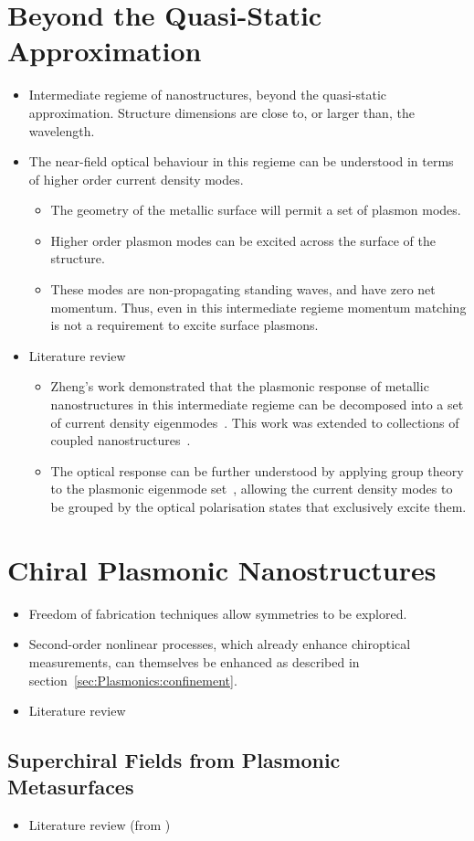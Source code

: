 \section{Beyond the Quasi-Static Approximation}
\begin{itemize}
    \item Intermediate regieme of nanostructures, beyond the quasi-static approximation. Structure dimensions are close to, or larger than, the wavelength.
    \item The near-field optical behaviour in this regieme can be understood in terms of higher order current density modes.
    \begin{itemize}
        \item The geometry of the metallic surface will permit a set of plasmon modes.
        \item Higher order plasmon modes can be excited across the surface of the structure.
        \item These modes are non-propagating standing waves, and have zero net momentum. Thus, even in this intermediate regieme momentum matching is not a requirement to excite surface plasmons.
    \end{itemize}
    \item Literature review
    \begin{itemize}
        \item Zheng's work demonstrated that the plasmonic response of metallic nanostructures in this intermediate regieme can be decomposed into a set of current density eigenmodes~\cite{Zheng2012}. This work was extended to collections of coupled nanostructures~\cite{Zheng2013}. 
        \item The optical response can be further understood by applying group theory to the plasmonic eigenmode set~\cite{Zheng2015}, allowing the current density modes to be grouped by the optical polarisation states that exclusively excite them.
    \end{itemize}
\end{itemize}


\section{Chiral Plasmonic Nanostructures}
\begin{itemize}
    \item Freedom of fabrication techniques allow symmetries to be explored.
    \item Second-order nonlinear processes, which already enhance chiroptical measurements, can themselves be enhanced as described in section~\ref{sec:Plasmonics:confinement}.
    \item Literature review
\end{itemize}

\subsection{Superchiral Fields from Plasmonic Metasurfaces}
\begin{itemize}
    \item Literature review (from \cite{Collins2017})
\end{itemize}